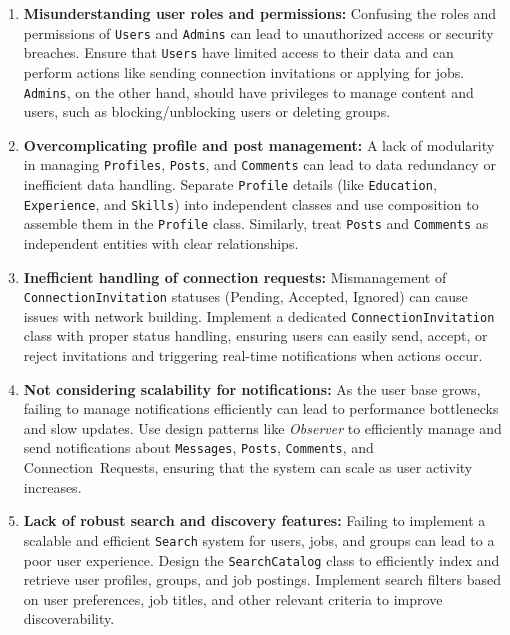 \begin{enumerate}
\item
\protect{}\label{WAIvQ5A9jQwCLaxEEh1aX}
\textbf{Misunderstanding user roles and permissions:} Confusing the roles and permissions of \texttt{Users} and \texttt{Admins} can lead to unauthorized access or security breaches. Ensure that \texttt{Users} have limited access to their data and can perform actions like sending connection invitations or applying for jobs. \texttt{Admins}, on the other hand, should have privileges to manage content and users, such as blocking/unblocking users or deleting groups.
\item
\protect{}\label{L--We_I7qoftYJcyO7l1m}
\textbf{Overcomplicating profile and post management:} A lack of modularity in managing \texttt{Profiles}, \texttt{Posts}, and \texttt{Comments} can lead to data redundancy or inefficient data handling. Separate \texttt{Profile} details (like \texttt{Education}, \texttt{Experience}, and \texttt{Skills}) into independent classes and use composition to assemble them in the \texttt{Profile} class. Similarly, treat \texttt{Posts} and \texttt{Comments} as independent entities with clear relationships.
\item
\protect{}\label{gwj2aLHPWweU7p4OOzRkR}
\textbf{Inefficient handling of connection requests:} Mismanagement of \texttt{ConnectionInvitation} statuses (Pending, Accepted, Ignored) can cause issues with network building. Implement a dedicated \texttt{ConnectionInvitation} class with proper status handling, ensuring users can easily send, accept, or reject invitations and triggering real-time notifications when actions occur.
\item
\protect{}\label{QGPZx2cPfWsmAJI0Z85ZD}
\textbf{Not considering scalability for notifications:} As the user base grows, failing to manage notifications efficiently can lead to performance bottlenecks and slow updates. Use design patterns like \emph{Observer} to efficiently manage and send notifications about \texttt{Messages}, \texttt{Posts}, \texttt{Comments}, and Connection\ Requests, ensuring that the system can scale as user activity increases.
\item
\protect{}\label{dKQFnJHs3iiX4lqfDJdzL}
\textbf{Lack of robust search and discovery features:} Failing to implement a scalable and efficient \texttt{Search} system for users, jobs, and groups can lead to a poor user experience. Design the \texttt{SearchCatalog} class to efficiently index and retrieve user profiles, groups, and job postings. Implement search filters based on user preferences, job titles, and other relevant criteria to improve discoverability.
\end{enumerate}


